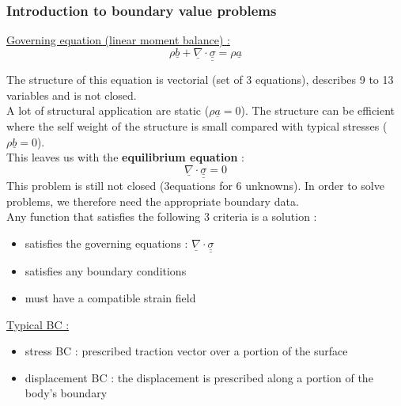 \documentclass[../main.tex]{subfiles}
\begin{document}
\subsubsection{Introduction to boundary value problems}
\quad \underline{Governing equation (linear moment balance) :}\\
\begin{equation}
    \rho \underline{b} + \underline{\nabla}\cdot \underline{\underline{\sigma}} = \rho \underline{a}
\end{equation}

The structure of this equation is vectorial (set of 3 equations), describes 9 to 13 variables and is not closed.\\

A lot of structural application are static ($\rho \underline{a} = 0$). The structure can be efficient where the self weight of the structure is small compared with typical stresses ($\rho \underline{b} = 0$).\\
This leaves us with the \textbf{equilibrium equation} : \begin{equation}
    \underline{\nabla} \cdot \underline{\underline{\sigma}} = 0
\end{equation}
This problem is still not closed (3equations for 6 unknowns). In order to solve problems, we therefore need the appropriate boundary data.\\
Any function that satisfies the following 3 criteria is a solution : \begin{itemize}
    \item satisfies the governing equations : $\underline{\nabla} \cdot \underline{\underline{\sigma}}$\\
    \item satisfies any boundary conditions\\
    \item must have a compatible strain field\\
\end{itemize}

\quad \underline{Typical BC :}\\
\begin{itemize}
    \item stress BC : prescribed traction vector over a portion of the surface\\
    \item displacement BC : the displacement is prescribed along a portion of the body's boundary\\
\end{itemize}
\end{document}
